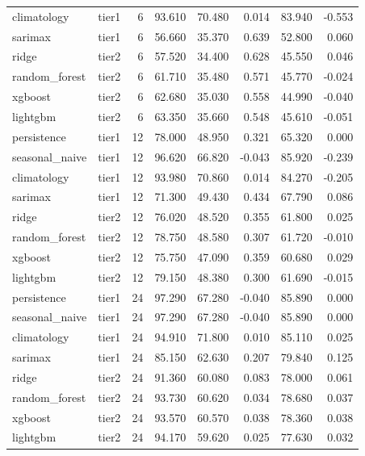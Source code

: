 \begin{table}[htbp]
\begin{tabular}{lrrrrrrr}
climatology & tier1 & 6 & 93.610 & 70.480 & 0.014 & 83.940 & -0.553 \\
sarimax & tier1 & 6 & 56.660 & 35.370 & 0.639 & 52.800 & 0.060 \\
ridge & tier2 & 6 & 57.520 & 34.400 & 0.628 & 45.550 & 0.046 \\
random\_forest & tier2 & 6 & 61.710 & 35.480 & 0.571 & 45.770 & -0.024 \\
xgboost & tier2 & 6 & 62.680 & 35.030 & 0.558 & 44.990 & -0.040 \\
lightgbm & tier2 & 6 & 63.350 & 35.660 & 0.548 & 45.610 & -0.051 \\
persistence & tier1 & 12 & 78.000 & 48.950 & 0.321 & 65.320 & 0.000 \\
seasonal\_naive & tier1 & 12 & 96.620 & 66.820 & -0.043 & 85.920 & -0.239 \\
climatology & tier1 & 12 & 93.980 & 70.860 & 0.014 & 84.270 & -0.205 \\
sarimax & tier1 & 12 & 71.300 & 49.430 & 0.434 & 67.790 & 0.086 \\
ridge & tier2 & 12 & 76.020 & 48.520 & 0.355 & 61.800 & 0.025 \\
random\_forest & tier2 & 12 & 78.750 & 48.580 & 0.307 & 61.720 & -0.010 \\
xgboost & tier2 & 12 & 75.750 & 47.090 & 0.359 & 60.680 & 0.029 \\
lightgbm & tier2 & 12 & 79.150 & 48.380 & 0.300 & 61.690 & -0.015 \\
persistence & tier1 & 24 & 97.290 & 67.280 & -0.040 & 85.890 & 0.000 \\
seasonal\_naive & tier1 & 24 & 97.290 & 67.280 & -0.040 & 85.890 & 0.000 \\
climatology & tier1 & 24 & 94.910 & 71.800 & 0.010 & 85.110 & 0.025 \\
sarimax & tier1 & 24 & 85.150 & 62.630 & 0.207 & 79.840 & 0.125 \\
ridge & tier2 & 24 & 91.360 & 60.080 & 0.083 & 78.000 & 0.061 \\
random\_forest & tier2 & 24 & 93.730 & 60.620 & 0.034 & 78.680 & 0.037 \\
xgboost & tier2 & 24 & 93.570 & 60.570 & 0.038 & 78.360 & 0.038 \\
lightgbm & tier2 & 24 & 94.170 & 59.620 & 0.025 & 77.630 & 0.032 \\
\bottomrule
\end{tabular}
\end{table}
